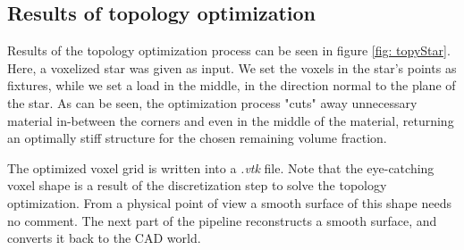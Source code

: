 \subsection{Results of topology optimization}
Results of the topology optimization process can be seen in figure \ref{fig: topyStar}. Here, a voxelized star was given as input. We set the voxels in the star's points as fixtures, while we set a load in the middle, in the direction normal to the plane of the star. As can be seen, the optimization process "cuts" away unnecessary material in-between the corners and even in the middle of the material, returning an optimally stiff structure for the chosen remaining volume fraction. 

The optimized voxel grid is written into a {\it.vtk} file. Note that the eye-catching voxel shape is a result of the discretization step to solve the topology optimization. From a physical point of view a smooth surface of this shape needs no comment. The next part of the pipeline reconstructs a smooth surface, and converts it back to the CAD world. 
